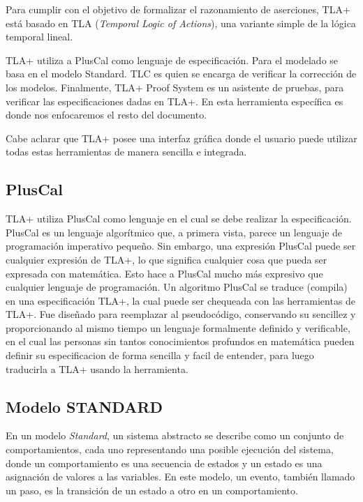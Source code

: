 \documentclass[spanish]{llncs}
\begin{document}
Para cumplir con el objetivo de formalizar el razonamiento de aserciones, TLA+ está basado en TLA (\textit{Temporal Logic of Actions}), una variante simple de la lógica temporal lineal.

TLA+ utiliza a PlusCal como lenguaje de especificación.
Para el modelado se basa en el modelo Standard.
TLC es quien se encarga de verificar la corrección de los modelos.
Finalmente, TLA+ Proof System es un asistente de pruebas, para verificar las especificaciones dadas en TLA+. 
En esta herramienta específica es donde nos enfocaremos el resto del documento. 


Cabe aclarar que TLA+ posee una interfaz gráfica donde el usuario puede utilizar todas estas herramientas de manera sencilla e integrada.

  \subsection{PlusCal}
  TLA+ utiliza PlusCal como lenguaje en el cual se debe realizar la especificación.
  PlusCal es un lenguaje algorítmico que, a primera vista, parece un lenguaje de programación imperativo pequeño. Sin embargo, una expresión PlusCal puede ser cualquier expresión de TLA+, lo que significa cualquier cosa que pueda ser expresada con matemática. Esto hace a PlusCal mucho más expresivo que cualquier lenguaje de programación.
  Un algoritmo PlusCal se traduce (compila) en una especificación TLA+, la cual puede ser chequeada con las herramientas de TLA+.
  Fue diseñado para  reemplazar al  pseudocódigo, conservando su sencillez y proporcionando al mismo tiempo un lenguaje formalmente definido y verificable, en el cual las personas sin tantos conocimientos profundos en matemática pueden definir su especificacion de forma sencilla y facil de entender,
  para luego traducirla a TLA+ usando la herramienta.

  \subsection{Modelo STANDARD}
  En un modelo \textit{Standard}, un sistema abstracto se describe como un conjunto de comportamientos, cada uno representando una posible ejecución del sistema, donde un comportamiento es una secuencia de estados y un estado es una asignación de valores a las variables.
  En este modelo, un evento, también llamado un paso, es la transición de un estado a otro en un comportamiento.
\end{document}
